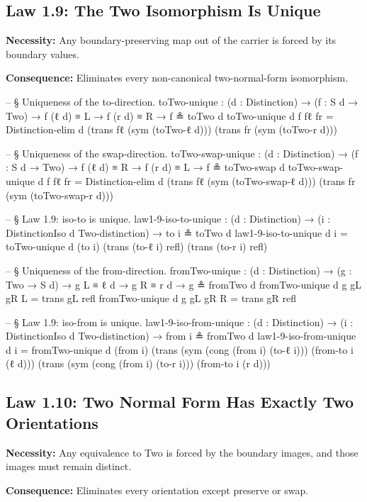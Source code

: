 \documentclass[11pt,a4paper]{book}
\def\texttt#1{#1}%
\begin{document}
\subsection{Law 1.9: The Two Isomorphism Is Unique}

\textbf{Necessity:} Any boundary-preserving map out of the carrier is forced by its boundary values.

\textbf{Consequence:} Eliminates every non-canonical two-normal-form isomorphism.

\begin{code}
-- § Uniqueness of the to-direction.
toTwo-unique :
  (d : Distinction) →
  (f : S d → Two) →
  f (ℓ d) ≡ L →
  f (r d) ≡ R →
  f ≗ toTwo d
toTwo-unique d f fℓ fr =
  Distinction-elim d
    (trans fℓ (sym (toTwo-ℓ d)))
    (trans fr (sym (toTwo-r d)))

-- § Uniqueness of the swap-direction.
toTwo-swap-unique :
  (d : Distinction) →
  (f : S d → Two) →
  f (ℓ d) ≡ R →
  f (r d) ≡ L →
  f ≗ toTwo-swap d
toTwo-swap-unique d f fℓ fr =
  Distinction-elim d
    (trans fℓ (sym (toTwo-swap-ℓ d)))
    (trans fr (sym (toTwo-swap-r d)))

-- § Law 1.9: iso-to is unique.
law1-9-iso-to-unique : (d : Distinction) → (i : DistinctionIso d Two-distinction) → to i ≗ toTwo d
law1-9-iso-to-unique d i =
  toTwo-unique d (to i)
    (trans (to-ℓ i) refl)
    (trans (to-r i) refl)

-- § Uniqueness of the from-direction.
fromTwo-unique :
  (d : Distinction) →
  (g : Two → S d) →
  g L ≡ ℓ d →
  g R ≡ r d →
  g ≗ fromTwo d
fromTwo-unique d g gL gR L = trans gL refl
fromTwo-unique d g gL gR R = trans gR refl

-- § Law 1.9: iso-from is unique.
law1-9-iso-from-unique : (d : Distinction) → (i : DistinctionIso d Two-distinction) → from i ≗ fromTwo d
law1-9-iso-from-unique d i =
  fromTwo-unique d (from i)
    (trans (sym (cong (from i) (to-ℓ i))) (from-to i (ℓ d)))
    (trans (sym (cong (from i) (to-r i))) (from-to i (r d)))
\end{code}

\subsection{Law 1.10: Two Normal Form Has Exactly Two Orientations}

\textbf{Necessity:} Any equivalence to \texttt{Two} is forced by the boundary images, and those images must remain distinct.

\textbf{Consequence:} Eliminates every orientation except preserve or swap.
\end{document}
